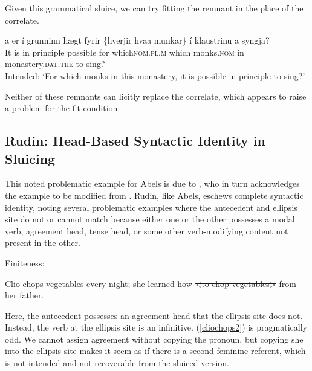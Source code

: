 \documentclass{turabian-researchpaper}
\begin{document}
Given this grammatical sluice, we can try fitting the remnant in the place of the correlate. 

\begin{exe}
\ex\label{monksis3}
\gll \TH a{\dh} er \'i  grunninn h\ae gt fyrir \{hverjir \textbar hva\dh a munkar\} \'i klaustrinu a{\dh} syngja? \\
It is in principle possible for which\textsc{nom.pl.m} which monks.\textsc{nom}  in monastery.\textsc{dat.the}  to   sing? \\ 
\trans Intended: `For which monks in this monastery, it is possible in principle to sing?'
\end{exe}

Neither of these remnants can licitly replace the correlate, which appears to raise a problem for the fit condition. 

\subsection{Rudin: Head-Based Syntactic Identity in Sluicing}

This noted problematic example for Abels is due to \citet{rudin}, who in turn acknowledges the example to be modified from \citet{chung2013syntactic}. Rudin, like Abels, eschews complete syntactic identity, noting several problematic examples where the antecedent and ellipsis site do not or cannot match because either one or the other possesses a modal verb, agreement head, tense head, or some other verb-modifying content not present in the other.  

Finiteness: 
\begin{exe}
\ex\label{clio1} 
\begin{xlist}
\ex \label{cliochops1}Clio chops vegetables every night; she learned how \sout{\textless to chop vegetables\textgreater} from her father. 
\end{xlist}
\end{exe}

Here, the antecedent possesses an agreement head that the ellipsis site does not. Instead, the verb at the ellipsis site is an infinitive. (\ref{cliochops2}) is pragmatically odd. We cannot assign agreement without copying the pronoun, but copying she into the ellipsis site makes it seem as if there is a second feminine referent, which is not intended and not recoverable from the sluiced version.  
\end{document}
